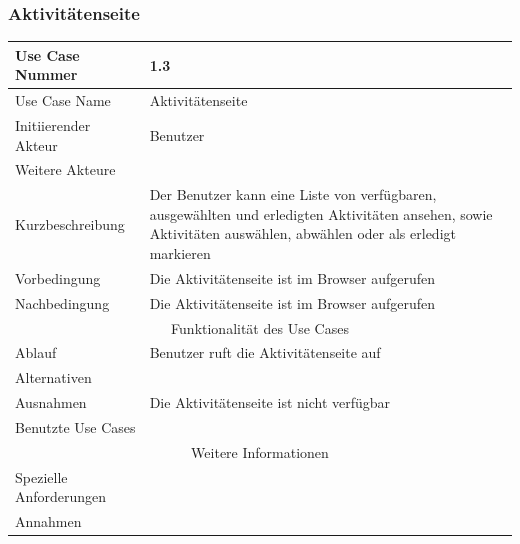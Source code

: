 \documentclass[10pt,a4paper]{article}
\begin{document}
	\subsubsection{Aktivit\"atenseite}
	\begin{tabular}{|l|p{.5\linewidth}|}
	\hline Use Case Nummer & 1.3 \\ 
	\hline Use Case Name & Aktivit\"atenseite \\ 
	\hline Initiierender Akteur & Benutzer \\
	\hline Weitere Akteure & \\
	\hline Kurzbeschreibung & Der Benutzer kann eine Liste von verf\"ugbaren, ausgew\"ahlten und erledigten Aktivit\"aten ansehen, sowie Aktivit\"aten ausw\"ahlen, abw\"ahlen oder als erledigt markieren \\
	\hline Vorbedingung & Die Aktivit\"atenseite ist im Browser aufgerufen \\
	\hline Nachbedingung & Die Aktivit\"atenseite ist im Browser aufgerufen \\
	\hline \multicolumn{2}{|c|}{Funktionalität des Use Cases}\\
	\hline Ablauf & Benutzer ruft die Aktivit\"atenseite auf \\
	\hline Alternativen & \\
	\hline Ausnahmen & Die Aktivit\"atenseite ist nicht verf\"ugbar \\
	\hline Benutzte Use Cases & \\
	\hline \multicolumn{2}{|c|}{Weitere Informationen} \\
	\hline Spezielle Anforderungen & \\
	\hline Annahmen & \\
	\hline
	\end{tabular} 
\end{document}
